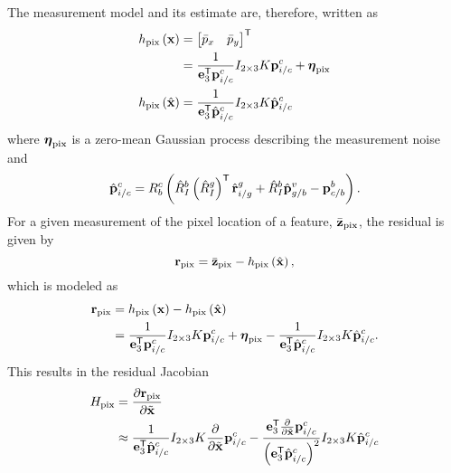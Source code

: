 The measurement model and its estimate are, therefore, written as
\begin{align}
  h_{\text{pix}} \left( \boldsymbol{\mathrm{x}} \right)
  &= \begin{bmatrix} \bar{p}_x & \bar{p}_y \end{bmatrix}^{\mathsf{T}} \\
  &= \frac{1}{\boldsymbol{\mathrm{e}}_3^{\mathsf{T}} \boldsymbol{\mathrm{p}}_{i/c}^c} I_{2 \times 3} K
  \boldsymbol{\mathrm{p}}_{i/c}^c + \boldsymbol{\mathrm{\eta}}_{\text{pix}} \\
  h_{\text{pix}} \left( \hat{\boldsymbol{\mathrm{x}}} \right)
  &= \frac{1}{\boldsymbol{\mathrm{e}}_3^{\mathsf{T}} \hat{\boldsymbol{\mathrm{p}}}_{i/c}^c} I_{2 \times 3} K
  \hat{\boldsymbol{\mathrm{p}}}_{i/c}^c
\end{align}
where $\boldsymbol{\mathrm{\eta}}_{\text{pix}}$ is a zero-mean Gaussian process describing the
measurement noise and
\begin{align}
  \hat{\boldsymbol{\mathrm{p}}}_{i/c}^c = R_b^c \left( \hat{R}_I^b \left( \hat{R}_I^g \right)^{\mathsf{T}}
  \hat{\boldsymbol{\mathrm{r}}}_{i/g}^g + \hat{R}_I^b \hat{\boldsymbol{\mathrm{p}}}_{g/b}^v - \boldsymbol{\mathrm{p}}_{c/b}^b
  \label{eq:p_i_c_c_hat}
\right).
\end{align}
For a given measurement of the pixel location of a feature,
$\bar{\boldsymbol{\mathrm{z}}}_{\text{pix}}$, the residual is given by
\begin{equation}
  \boldsymbol{\mathrm{r}}_{\text{pix}} = \bar{\boldsymbol{\mathrm{z}}}_{\text{pix}} - h_{\text{pix}} \left( \hat{\boldsymbol{\mathrm{x}}}
    \right),
\end{equation}
which is modeled as
\begin{align}
  \boldsymbol{\mathrm{r}}_{\text{pix}} &= h_{\text{pix}} \left( \boldsymbol{\mathrm{x}} \right) - h_{\text{pix}} \left( \hat{\boldsymbol{\mathrm{x}}}
    \right) \\
  &= \frac{1}{\boldsymbol{\mathrm{e}}_3^{\mathsf{T}} \boldsymbol{\mathrm{p}}_{i/c}^c} I_{2 \times 3} K
  \boldsymbol{\mathrm{p}}_{i/c}^c + \boldsymbol{\mathrm{\eta}}_{\text{pix}} - \frac{1}{\boldsymbol{\mathrm{e}}_3^{\mathsf{T}} \hat{\boldsymbol{\mathrm{p}}}_{i/c}^c} I_{2 \times 3} K
  \hat{\boldsymbol{\mathrm{p}}}_{i/c}^c.
  \label{eq:rpix}
\end{align}
This results in the residual Jacobian
\begin{align}
  H_{\text{pix}} &= \frac{ \partial \boldsymbol{\mathrm{r}}_{\text{pix}} }{ \partial \tilde{\boldsymbol{\mathrm{x}}}} \\
  &\approx
  \frac{1}{\boldsymbol{\mathrm{e}}_3^{\mathsf{T}} \hat{\boldsymbol{\mathrm{p}}}_{i/c}^c} I_{2 \times 3} K
 \frac{\partial}{\partial \tilde{\boldsymbol{\mathrm{x}}}} \boldsymbol{\mathrm{p}}_{i/c}^c 
 - \frac{\boldsymbol{\mathrm{e}}_3^{\mathsf{T}} \frac{\partial}{\partial \tilde{\boldsymbol{\mathrm{x}}}} 
 \boldsymbol{\mathrm{p}}_{i/c}^c}{\left( \boldsymbol{\mathrm{e}}_3^{\mathsf{T}}
 \hat{\boldsymbol{\mathrm{p}}}_{i/c}^c \right)^2 } I_{2 \times 3} K
 \hat{\boldsymbol{\mathrm{p}}}_{i/c}^c
\end{align}
